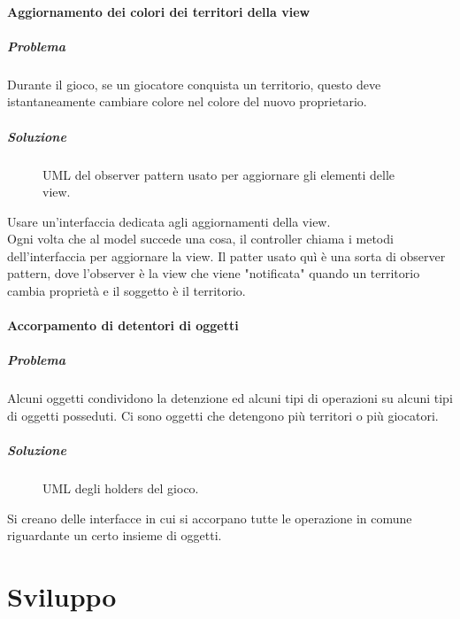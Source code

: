 \documentclass[a4paper,12pt]{report}
\begin{document}
\subsubsection{Aggiornamento dei colori dei territori della view}
\paragraph{Problema}
Durante il gioco, se un giocatore conquista un territorio, questo deve istantaneamente cambiare colore nel colore del nuovo proprietario.
\paragraph{Soluzione}
\begin{figure}[H]
	\centering
	
	\caption{UML del observer pattern usato per aggiornare gli elementi delle view.}
\end{figure}
Usare un'interfaccia dedicata agli aggiornamenti della view.
\\
Ogni volta che al model succede una cosa, il controller chiama i metodi dell'interfaccia per aggiornare la view.
Il patter usato quì è una sorta di observer pattern, dove l'observer è la view che viene "notificata" quando un territorio cambia proprietà e il soggetto è il territorio.
\subsubsection{Accorpamento di detentori di oggetti}
\paragraph{Problema}
Alcuni oggetti condividono la detenzione ed alcuni tipi di operazioni su alcuni tipi di oggetti posseduti.
Ci sono oggetti che detengono più territori o più giocatori.
\paragraph{Soluzione}
\begin{figure}[H]
	\centering
	
	\caption{UML degli holders del gioco.}
\end{figure}
Si creano delle interfacce in cui si accorpano tutte le operazione in comune riguardante un certo insieme di oggetti.

\chapter{Sviluppo}
\end{document}
